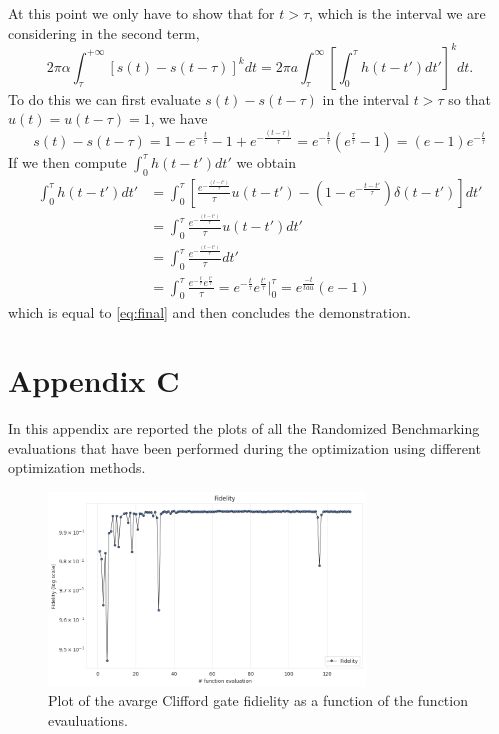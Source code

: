 At this point we only have to show that for $t>\tau$, which is the interval we are considering in the second term, 
\begin{equation}
    2\pi\alpha \int_{\tau}^{+\infty} \left[ s(t) - s(t-\tau) \right]^k dt = 2\pi a \int_{\tau}^{\infty} \left[ \int_{0}^{\tau} h(t - t') dt' \right]^k dt.
\end{equation}
%
To do this we can first evaluate $s(t)-s(t-\tau)$ in the interval $t>\tau$ so that $u(t)=u(t-\tau)=1$, we have
\begin{equation}\label{eq:final}
    s(t) - s(t-\tau) = 1- e^{-\frac{t}{\tau}} - 1 + e^{-\frac{(t-\tau)}{\tau}} = e^{-\frac{t}{\tau}} \left(e^{\frac{\tau}{\tau}}-1\right) = (e-1)e^{-\frac{t}{\tau}}
\end{equation}
%
If we then compute $\int_{0}^{\tau} h(t - t')dt'$ we obtain
\begin{align}
    \int_{0}^{\tau} h(t-t')dt' &= \int_{0}^{\tau} \left[ \frac{e^{-\frac{(t-t')}{\tau}}}{\tau} u(t-t') - \left(1-e^{-\frac{t-t'}{\tau}}\right)\delta(t-t') \right] dt'\\
    &= \int_{0}^{\tau} \frac{e^{-\frac{(t-t')}{\tau}}}{\tau} u(t-t')dt' \\
    &= \int_{0}^{\tau} \frac{e^{-\frac{(t-t')}{\tau}}}{\tau} dt'\\
    &= \int_{0}^{\tau} \frac{e^{-\frac{t}{\tau}}e^{\frac{t'}{\tau}}}{\tau} = e^{-\frac{t}{\tau}}e^{\frac{t'}{\tau}}\Big|_{0}^{\tau} = e^{\frac{-t}{tau}}(e-1)
\end{align}
which is equal to \ref{eq:final} and then concludes the demonstration.

\chapter{Appendix C}\label{app:AppendixC}

In this appendix are reported the plots of all the Randomized Benchmarking evaluations that have been performed during the optimization using different optimization methods.
\begin{figure}[!h]
    \centering
    \includegraphics[width=0.75\textwidth]{figures/png/RB_optimization/NM/post_ft_true/NM_complete.png}
    \caption{Plot of the avarge Clifford gate fidielity as a function of the function evauluations.}
    \label{fig:NM}
\end{figure}

